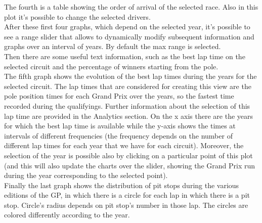 \documentclass[11pt,twocolumn,letterpaper]{article}
\begin{document}
The fourth is a table showing the order of arrival of the selected race. Also in this plot it's possible to change the selected drivers.\\
After these first four graphs, which depend on the selected year, it's possible to see a range slider that allows to dynamically modify subsequent information and graphs over an interval of years. By default the max range is selected. \\
Then there are some useful text information, such as the best lap time on the selected circuit and the percentage of winners starting from the pole. \\
The fifth graph shows the evolution of the best lap times during the years for the selected circuit. The lap times that are considered for creating this view are the pole position times for each Grand Prix over the years, so the fastest time recorded during the qualifyings. Further information about the selection of this lap time are provided in the Analytics section. On the x axis there are the years for which the best lap time is available while the y-axis shows the times at intervals of different frequencies (the frequency depends on the number of different lap times for each year that we have for each circuit). Moreover, the selection of the year is possible also by clicking on a particular point of this plot (and this will also update the charts over the slider, showing the Grand Prix run during the year corresponding to the selected point).\\
Finally the last graph shows the distribution of pit stops during the various editions of the GP, in which there is a circle for each lap in which there is a pit stop. Circle's radius depends on pit stop's number in those lap. The circles are colored differently according to the year.
\end{document}
